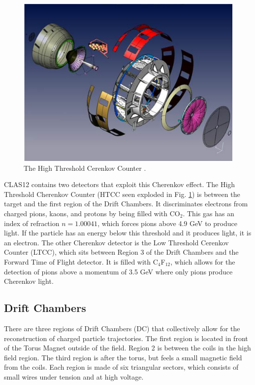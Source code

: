 \begin{figure}
	\centering
	\includegraphics[width=0.9\linewidth]{figures/htcc.png}
	\caption[The High Threshold Cerenkov Counter.]{\label{fig:htcc}The High Threshold Cerenkov Counter \cite{clas12:HTCC}.}
\end{figure}
CLAS12 contains two detectors that exploit this Cherenkov effect. The High Threshold Cherenkov Counter (HTCC seen exploded in Fig. \ref{fig:htcc}) is between the target and the first region of the Drift Chambers. It discriminates electrons from charged pions, kaons, and protons by being filled with CO$_2$.\cite{clas12:HTCC} This gas has an index of refraction $n=1.00041$, which forces pions above 4.9 GeV to produce light. If the particle has an energy below this threshold and it produces light, it is an electron. The other Cherenkov detector is the Low Threshold Cerenkov Counter (LTCC), which sits between Region 3 of the Drift Chambers and the Forward Time of Flight detector. It is filled with C$_4$F$_{12}$, which allows for the detection of pions above a momentum of 3.5 GeV where only pions produce Cherenkov light.\cite{clas12:LTCC}

\subsection{Drift Chambers}
There are three regions of Drift Chambers (DC) that collectively allow for the reconstruction of charged particle trajectories. The first region is located in front of the Torus Magnet outside of the field. Region 2 is between the coils in the high field region. The third region is after the torus, but feels a small magnetic field from the coils. Each region is made of six triangular sectors, which consists of small wires under tension and at high voltage. 

